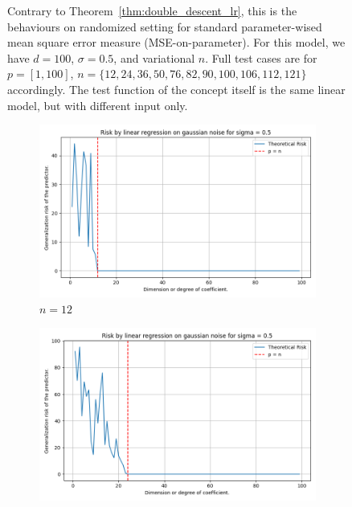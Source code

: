 \documentclass[twoside,10pt]{article}
\begin{document}
\begin{figure}[htb]
  \caption{Contrary to Theorem~\ref{thm:double_descent_lr}, this is the behaviours on randomized setting for standard parameter-wised mean square error measure (MSE-on-parameter). For this model, we have $d=100$, $\sigma = 0.5$, and variational $n$. Full test cases are for $p=[1,100]$, $n=\{12,24,36,50,76,82,90,100,106,112,121\}$ accordingly. The test function of the concept itself is the same linear model, but with different input only.}
  \label{fig:11grid2}
\end{figure}

\begin{figure}[htb]
  \centering
  \newcommand{\imgwidth}{0.22\textwidth}

  \begin{subfigure}[b]{\imgwidth}
    \includegraphics[width=\linewidth]{img/descent_devel_t1.png}
    \caption{$n=12$}\label{fig:1a21}
  \end{subfigure}%
  \hfill
  \begin{subfigure}[b]{\imgwidth}
    \includegraphics[width=\linewidth]{img/descent_devel_t2.png}

\end{subfigure}
\end{figure}
\end{document}
